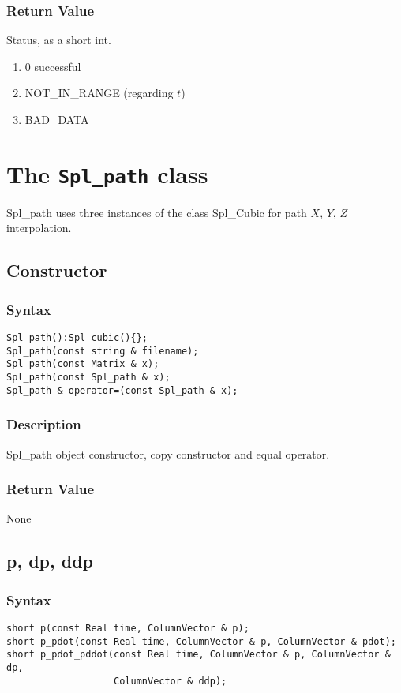 \documentclass[dvips,11pt,fleqn]{report}
\begin{document}
\subsubsection*{Return Value}

Status, as a short int.
\begin{enumerate}
\item[] 0 successful
\item[] NOT\_IN\_RANGE (regarding $t$)
\item[] BAD\_DATA
\end{enumerate}


\newpage

\section{The \texttt{Spl\_path} class}

Spl\_path uses three instances of the class Spl\_Cubic for path $X$,
$Y$, $Z$ interpolation.

\subsection*{Constructor}
\subsubsection*{Syntax}
\begin{verbatim}
Spl_path():Spl_cubic(){};
Spl_path(const string & filename);
Spl_path(const Matrix & x);
Spl_path(const Spl_path & x);
Spl_path & operator=(const Spl_path & x);
\end{verbatim}

\subsubsection*{Description}   
Spl\_path object constructor, copy constructor and equal operator.

\subsubsection*{Return Value}

None

\newpage

\subsection*{p, dp, ddp}
\subsubsection*{Syntax}
\begin{verbatim}
short p(const Real time, ColumnVector & p);
short p_pdot(const Real time, ColumnVector & p, ColumnVector & pdot);
short p_pdot_pddot(const Real time, ColumnVector & p, ColumnVector & dp, 
                   ColumnVector & ddp);
\end{verbatim}
\end{document}
